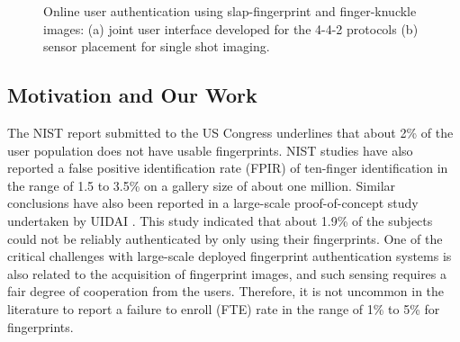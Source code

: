 \begin{figure}
    \centering
    \hspace{0.1in}
    \caption{Online user authentication using slap-fingerprint and finger-knuckle images: (a) joint user interface developed for the 4-4-2 protocols (b) sensor placement for single shot imaging.}
    \label{system}
\end{figure}

\subsection{Motivation and Our Work\label{motivation-contribution}}

The NIST report submitted to the US Congress \cite{2002SUMMARYON} underlines that about 2\% of the user population does not have usable fingerprints. NIST studies have also reported a false positive identification rate (FPIR) of ten-finger identification in the range of 1.5 to 3.5\% on a gallery size of about one million. Similar conclusions have also been reported in a large-scale proof-of-concept study undertaken by UIDAI \cite{uidai}. This study indicated that about 1.9\% of the subjects could not be reliably authenticated by only using their fingerprints. One of the critical challenges with large-scale deployed fingerprint authentication systems is also related to the acquisition of fingerprint images, and such sensing requires a fair degree of cooperation from the users. Therefore, it is not uncommon in the literature to report a failure to enroll (FTE) rate in the range of 1\% to 5\% for fingerprints. 

